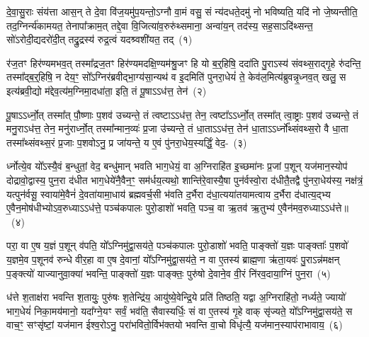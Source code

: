 \setcounter{anuvakam}{0}
दे॒वा॒सु॒राः संय॑त्ता आस॒न् ते दे॒वा वि॑ज॒यमु॑प॒यन्तो॒\-ऽग्नौ वा॒मं वसु॒ सं न्य॑दधते॒दमु॑ नो भविष्यति॒ यदि॑ नो जे॒ष्यन्तीति॒ तद॒ग्निर्न्य॑कामयत॒ तेनापा᳚क्राम॒त् तद्दे॒वा वि॒जित्या॑व॒रुरु॑थ्समाना॒ अन्वा॑य॒न् तद॑स्य॒ सह॒सा\-ऽदि॑थ्सन्त॒ सो॑\-ऽरोदी॒द्यदरो॑दी॒त् तद्रु॒द्रस्य॑ रुद्र॒त्वं यदश्र्वशी॑यत॒ तद्~(१)\ip

र॑ज॒तꣳ हिर॑ण्यमभव॒त् तस्मा᳚द्\-रज॒तꣳ हिर॑ण्यमदक्षि॒ण्य\-म॑श्रु॒जꣳ हि यो ब॒र्॒\mbox{}हिषि॒ ददा॑ति पु॒रा\-ऽस्य॑ संवथ्स॒राद्गृ॒हे रु॑दन्ति॒ तस्मा᳚द्\-ब॒र्॒\mbox{}हिषि॒ न देय॒ꣳ॒ सो᳚\-ऽग्निर॑ब्रवीद्भा॒ग्य॑सा॒न्यथ॑ व इ॒दमिति॑ पुनरा॒धेयं॑ ते॒ केव॑ल॒मित्य॑ब्रुवन्नृ॒ध्नव॒त् खलु॒ स इत्य॑ब्रवी॒द्यो म॑द्देव॒त्य॑म॒ग्निमा॒दधा॑ता॒ इति॒ तं पू॒षा\-ऽऽ\-ध॑त्त॒ तेन॑~(२)\ip

पू॒षा\-ऽऽ\-र्ध्नो॒त् तस्मा᳚त् पौ॒ष्णाः प॒शव॑ उच्यन्ते॒ तं त्वष्टा\-ऽऽ\-ध॑त्त॒ तेन॒ त्वष्टा᳚\-ऽऽ\-र्ध्नो॒त् तस्मा᳚त् त्वा॒ष्ट्राः प॒शव॑ उच्यन्ते॒ तं मनु॒रा\-ऽध॑त्त॒ तेन॒ मनु॑रार्ध्नो॒त् तस्मा᳚न्मान॒व्यः॑ प्र॒जा उ॑च्यन्ते॒ तं धा॒ता\-ऽऽ\-ध॑त्त॒ तेन॑ धा॒ता\-ऽऽ\-र्ध्नो᳚थ्संवथ्स॒रो वै धा॒ता तस्मा᳚थ्संवथ्स॒रं प्र॒जाः प॒शवो\-ऽनु॒ प्र जा॑यन्ते॒ य ए॒वं पु॑नरा॒धेय॒स्यर्द्धिं॒ वेद॒-~(३)\ip

र्ध्नोत्ये॒व यो᳚\-ऽस्यै॒वं ब॒न्धुतां॒ वेद॒ बन्धु॑मान् भवति भाग॒\-धेयं॒ वा अ॒ग्निराहि॑त इ॒च्छमा॑नः प्र॒जां प॒शून् यज॑मान॒स्योप॑ दोद्रावो॒द्वास्य॒ पुन॒रा द॑धीत भाग॒\-धेये॑नै॒वैन॒ꣳ॒ सम॑र्धय॒त्यथो॒ शान्ति॑रे॒वास्यै॒षा पुन॑र्वस्वो॒रा द॑धीतै॒तद्वै पु॑नरा॒धेय॑स्य॒ नक्ष॑त्रं॒ यत्पुन॑र्वसू॒ स्वाया॑मे॒वैनं॑ दे॒वता॑यामा॒धाय॑ ब्रह्मवर्च॒सी भ॑वति द॒र्भैरा द॑धा॒त्यया॑तयामत्वाय द॒र्भैरा द॑धात्य॒द्भ्य ए॒वैन॒मोष॑धीभ्यो\-ऽव॒रुध्या\-ऽऽ\-ध॑त्ते॒ पञ्च॑कपालः पुरो॒डाशो॑ भवति॒ पञ्च॒ वा ऋ॒तव॑ ऋ॒तुभ्य॑ ए॒वैन॑मव॒रुध्या\-ऽऽ\-ध॑त्ते॥~(४)\ip

{\anuvakamend[{अशी॑यत॒ तत् तेन॒ वेद॑ द॒र्भैः पञ्च॑विꣳशतिश्च}]}

परा॒ वा ए॒ष य॒ज्ञं प॒शून् व॑पति॒ यो᳚\-ऽग्निमु॑द्वा॒सय॑ते॒ पञ्च॑कपालः पुरो॒डाशो॑ भवति॒ पाङ्क्तो॑ य॒ज्ञः पाङ्क्ताः᳚ प॒शवो॑ य॒ज्ञमे॒व प॒शूनव॑ रुन्धे वीर॒हा वा ए॒ष दे॒वानां॒ यो᳚\-ऽग्निमु॑द्वा॒सय॑ते॒ न वा ए॒तस्य॑ ब्राह्म॒णा ऋ॑ता॒यवः॑ पु॒रा\-ऽन्न॑मक्षन् प॒ङ्क्त्यो॑ याज्यानुवा॒क्या॑ भवन्ति॒ पाङ्क्तो॑ य॒ज्ञः पाङ्क्तः॒ पुरु॑षो दे॒वाने॒व वी॒रं नि॑रव॒दाया॒ग्निं पुन॒रा~(५)\ip

ध॑त्ते श॒ताक्ष॑रा भवन्ति श॒तायुः॒ पुरु॑षः श॒तेन्द्रि॑य॒ आयु॑ष्ये॒वेन्द्रि॒ये प्रति॑ तिष्ठति॒ यद्वा अ॒ग्निराहि॑तो॒ नर्ध्यते॒ ज्यायो॑ भाग॒\-धेयं॑ निका॒मय॑मानो॒ यदा᳚ग्ने॒यꣳ सर्वं॒ भव॑ति॒ सैवास्यर्धिः॒ सं वा ए॒तस्य॑ गृ॒हे वाक् सृ॑ज्यते॒ यो᳚\-ऽग्निमु॑द्वा॒सय॑ते॒ स वाच॒ꣳ॒ सꣳसृ॑ष्टां॒ यज॑मान ईश्व॒रो\-ऽनु॒ परा॑भवितो॒र्विभ॑क्तयो भवन्ति वा॒चो विधृ॑त्यै॒ यज॑मान॒स्याप॑राभावाय॒~(६)\ip

